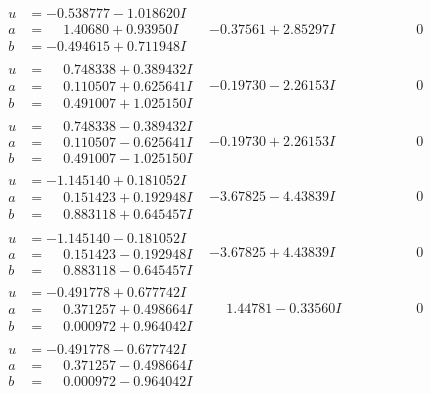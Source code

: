 \documentclass[1p]{elsarticle_modified}
\theoremstyle{definition}
\begin{document}
$$\begin{array}{c|c|c}
\begin{aligned}
u &= -0.538777 - 1.018620 I \\
a &= \phantom{-}1.40680 + 0.93950 I \\
b &= -0.494615 + 0.711948 I\end{aligned}
 & -0.37561 + 2.85297 I & \phantom{-0.000000 } 0 \\ \hline\begin{aligned}
u &= \phantom{-}0.748338 + 0.389432 I \\
a &= \phantom{-}0.110507 + 0.625641 I \\
b &= \phantom{-}0.491007 + 1.025150 I\end{aligned}
 & -0.19730 - 2.26153 I & \phantom{-0.000000 } 0 \\ \hline\begin{aligned}
u &= \phantom{-}0.748338 - 0.389432 I \\
a &= \phantom{-}0.110507 - 0.625641 I \\
b &= \phantom{-}0.491007 - 1.025150 I\end{aligned}
 & -0.19730 + 2.26153 I & \phantom{-0.000000 } 0 \\ \hline\begin{aligned}
u &= -1.145140 + 0.181052 I \\
a &= \phantom{-}0.151423 + 0.192948 I \\
b &= \phantom{-}0.883118 + 0.645457 I\end{aligned}
 & -3.67825 - 4.43839 I & \phantom{-0.000000 } 0 \\ \hline\begin{aligned}
u &= -1.145140 - 0.181052 I \\
a &= \phantom{-}0.151423 - 0.192948 I \\
b &= \phantom{-}0.883118 - 0.645457 I\end{aligned}
 & -3.67825 + 4.43839 I & \phantom{-0.000000 } 0 \\ \hline\begin{aligned}
u &= -0.491778 + 0.677742 I \\
a &= \phantom{-}0.371257 + 0.498664 I \\
b &= \phantom{-}0.000972 + 0.964042 I\end{aligned}
 & \phantom{-}1.44781 - 0.33560 I & \phantom{-0.000000 } 0 \\ \hline\begin{aligned}
u &= -0.491778 - 0.677742 I \\
a &= \phantom{-}0.371257 - 0.498664 I \\
b &= \phantom{-}0.000972 - 0.964042 I\end{aligned}

\end{array}$$
\end{document}
